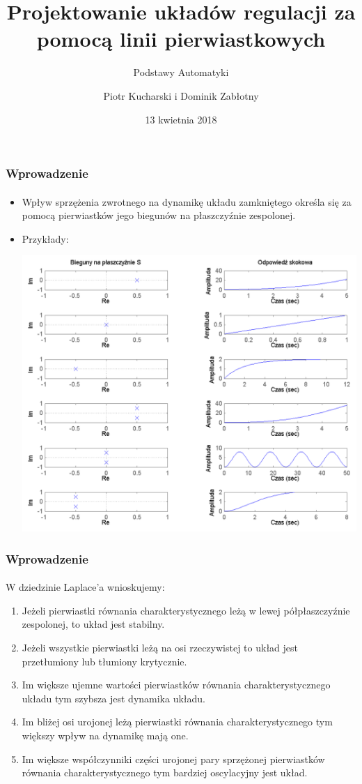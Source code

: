 \documentclass{beamer}
\title{Projektowanie układów regulacji za pomocą linii pierwiastkowych}
\subtitle{Podstawy Automatyki}
\author{Piotr Kucharski i Dominik Zabłotny}
\institute{Wydział Elekrotechniki, Automatyki, Informatyki i Inżynierii Biomedycznej}
\date{13 kwietnia 2018}
\begin{document}
\titleframe[pl]

\begin{frame}\frametitle{Wprowadzenie}\framesubtitle{}
	\begin{itemize}
		\item Wpływ sprzężenia zwrotnego na dynamikę układu zamkniętego określa się za pomocą pierwiastków jego biegunów na płaszczyźnie zespolonej.
		
		\item Przykłady:
	
	
		\centering \includegraphics[scale=0.2]{tabela.png}
	\end{itemize}
	
\end{frame}

\begin{frame}\frametitle{Wprowadzenie}\framesubtitle{}
	W dziedzinie Laplace'a wnioskujemy:
	\begin{enumerate}
		\item Jeżeli pierwiastki równania charakterystycznego leżą w lewej półpłaszczyźnie zespolonej, to układ jest stabilny.
		
		\item Jeżeli wszystkie pierwiastki leżą na osi rzeczywistej to układ jest przetłumiony lub tłumiony krytycznie.
		
		\item Im większe ujemne wartości pierwiastków równania charakterystycznego układu tym szybsza jest dynamika układu.
		
		\item Im bliżej osi urojonej leżą pierwiastki równania charakterystycznego tym większy wpływ na dynamikę mają one.
		
		\item Im większe współczynniki części urojonej pary sprzężonej pierwiastków równania charakterystycznego tym bardziej oscylacyjny jest układ.
	\end{enumerate}
\end{frame}
\end{document}

